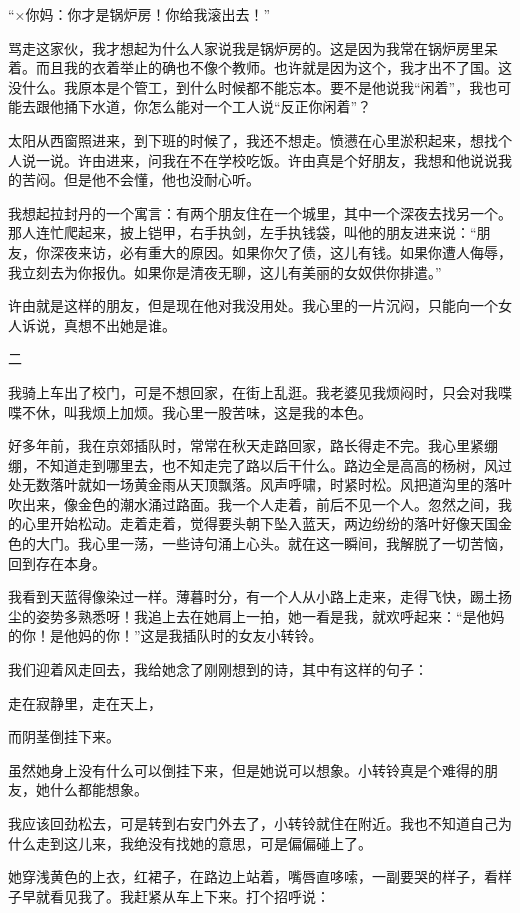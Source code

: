  “×你妈：你才是锅炉房！你给我滚出去！” 
 
 骂走这家伙，我才想起为什么人家说我是锅炉房的。这是因为我常在锅炉房里呆着。而且我的衣着举止的确也不像个教师。也许就是因为这个，我才出不了国。这没什么。我原本是个管工，到什么时候都不能忘本。要不是他说我“闲着”，我也可能去跟他捅下水道，你怎么能对一个工人说“反正你闲着”？ 
 
 太阳从西窗照进来，到下班的时候了，我还不想走。愤懑在心里淤积起来，想找个人说一说。许由进来，问我在不在学校吃饭。许由真是个好朋友，我想和他说说我的苦闷。但是他不会懂，他也没耐心听。 
 
 我想起拉封丹的一个寓言：有两个朋友住在一个城里，其中一个深夜去找另一个。那人连忙爬起来，披上铠甲，右手执剑，左手执钱袋，叫他的朋友进来说：“朋友，你深夜来访，必有重大的原因。如果你欠了债，这儿有钱。如果你遭人侮辱，我立刻去为你报仇。如果你是清夜无聊，这儿有美丽的女奴供你排遣。” 
 
 许由就是这样的朋友，但是现在他对我没用处。我心里的一片沉闷，只能向一个女人诉说，真想不出她是谁。 
 
 二 
 
 我骑上车出了校门，可是不想回家，在街上乱逛。我老婆见我烦闷时，只会对我喋喋不休，叫我烦上加烦。我心里一股苦味，这是我的本色。 
 
 好多年前，我在京郊插队时，常常在秋天走路回家，路长得走不完。我心里紧绷绷，不知道走到哪里去，也不知走完了路以后干什么。路边全是高高的杨树，风过处无数落叶就如一场黄金雨从天顶飘落。风声呼啸，时紧时松。风把道沟里的落叶吹出来，像金色的潮水涌过路面。我一个人走着，前后不见一个人。忽然之间，我的心里开始松动。走着走着，觉得要头朝下坠入蓝天，两边纷纷的落叶好像天国金色的大门。我心里一荡，一些诗句涌上心头。就在这一瞬间，我解脱了一切苦恼，回到存在本身。 
 
 我看到天蓝得像染过一样。薄暮时分，有一个人从小路上走来，走得飞快，踢土扬尘的姿势多熟悉呀！我追上去在她肩上一拍，她一看是我，就欢呼起来：“是他妈的你！是他妈的你！”这是我插队时的女友小转铃。 
 
 我们迎着风走回去，我给她念了刚刚想到的诗，其中有这样的句子： 
 
 走在寂静里，走在天上， 
 
 而阴茎倒挂下来。 
 
 虽然她身上没有什么可以倒挂下来，但是她说可以想象。小转铃真是个难得的朋友，她什么都能想象。 
 
 我应该回劲松去，可是转到右安门外去了，小转铃就住在附近。我也不知道自己为什么走到这儿来，我绝没有找她的意思，可是偏偏碰上了。 
 
 她穿浅黄色的上衣，红裙子，在路边上站着，嘴唇直哆嗦，一副要哭的样子，看样子早就看见我了。我赶紧从车上下来。打个招呼说： 
 
